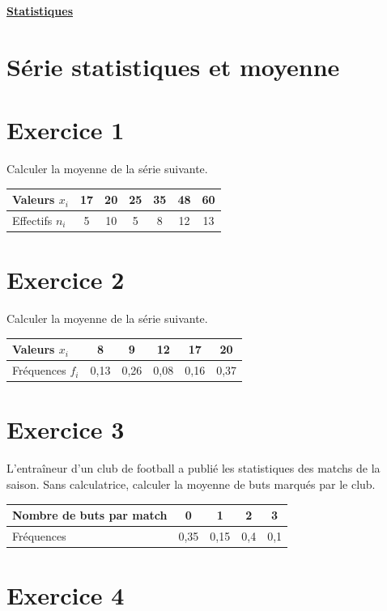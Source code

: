 \documentclass[french]{article}
\begin{document}
\twocolumn
\begin{center}
\underline{\textbf{Statistiques}}
\end{center}
\section{Série statistiques et moyenne}
\section*{Exercice 1}

Calculer la moyenne de la série suivante.

   \begin{tabular}{| l | c | c | c | c | c | c |}
     \hline
     Valeurs $x_i$ & 17 & 20 & 25 & 35 & 48 & 60 \\ \hline
     Effectifs $n_i$ & 5 & 10 & 5 & 8 & 12 & 13 \\ 
     \hline
   \end{tabular}
\section*{Exercice 2}

Calculer la moyenne de la série suivante.

   \begin{tabular}{| l | c | c | c | c | c |}
     \hline
     Valeurs $x_i$ & 8 & 9 & 12 & 17 & 20 \\ \hline
     Fréquences $f_i$ & 0,13 & 0,26 & 0,08 & 0,16 & 0,37 \\ 
     \hline
    \end{tabular}
    
\section*{Exercice 3}
L'entraîneur d'un club de football a publié les statistiques des matchs de la saison. Sans calculatrice, calculer la moyenne de buts marqués par le club.

   \begin{tabular}{| l | c | c | c | c |}
     \hline
     Nombre de buts par match & 0 & 1 & 2 & 3 \\ \hline
     Fréquences & 0,35 & 0,15 & 0,4 & 0,1\\ 
     \hline
    \end{tabular}

\section*{Exercice 4}
\end{document}
